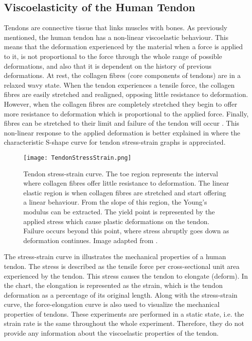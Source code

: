 \subsection{Viscoelasticity of the Human Tendon} \label{sec:viscoelasticity}

Tendons are connective tissue that links muscles with bones. As previously mentioned, the human tendon has a non-linear viscoelastic behaviour. This means that the deformation experienced by the material when a force is applied to it, is not proportional to the force through the whole range of possible deformations, and also that it is dependent on the history of previous deformations. At rest, the collagen fibres (core components of tendons) are in a relaxed wavy state. When the tendon experiences a tensile force, the collagen fibres are easily stretched and realigned, opposing little resistance to deformation. However, when the collagen fibres are completely stretched they begin to offer more resistance to deformation which is proportional to the applied force. Finally, fibres can be stretched to their limit and failure of the tendon will occur \cite{nordin2001basic}. This non-linear response to the applied deformation is better explained in  where the characteristic S-shape curve for tendon stress-strain graphs is appreciated.

\begin{figure}[htb!]
    \centering
    \texttt{[image: TendonStressStrain.png]}
    \caption{Tendon stress-strain curve. The toe region represents the interval where collagen fibres offer little resistance to deformation. The linear elastic region is when collagen fibres are stretched and start offering a linear behaviour. From the slope of this region, the Young's modulus can be extracted. The yield point is represented by the applied stress which cause plastic deformations on the tendon. Failure occurs beyond this point, where stress abruptly goes down as deformation continues. Image adapted from \cite{maurel1998biomechanical}. }
    \label{fig:tendonSS}
\end{figure}

The stress-strain curve in  illustrates the mechanical properties of a human tendon. The stress is described as the tensile force per cross-sectional unit area experienced by the tendon. This stress causes the tendon to elongate (deform). In the chart, the elongation is represented as the strain, which is the tendon deformation as a percentage of its original length. Along with the stress-strain curve, the force-elongation curve is also used to visualize the mechanical properties of tendons. These experiments are performed in a static state, i.e. the strain rate is the same throughout the whole experiment. Therefore, they do not provide any information about the viscoelastic properties of the tendon.

